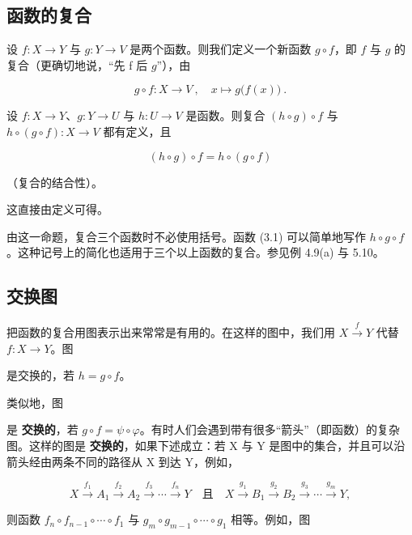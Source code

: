 \subsection*{函数的复合}

设 $f: X \to Y$ 与 $g: Y \to V$ 是两个函数。则我们定义一个新函数 $g \circ f$，即 $f$ 与 $g$ 的复合（更确切地说，“先 f 后 $g$”），由

\[
g\circ f\colon X\to V~,\quad x\mapsto g\bigl(f(x)\bigr)~.
\]

\begin{proposition}

设 $f: X \to Y$、$g: Y \to U$ 与 $h: U \to V$ 是函数。则复合 $(h \circ g) \circ f$ 与 $h \circ (g \circ f): X \to V$ 都有定义，且

\begin{equation}
(h\circ g)\circ f=h\circ(g\circ f)
\end{equation}

（复合的结合性）。

\proofhead
这直接由定义可得。

由这一命题，复合三个函数时不必使用括号。函数 (3.1) 可以简单地写作 $ h \circ g \circ f $。这种记号上的简化也适用于三个以上函数的复合。参见例 4.9(a) 与 5.10。
\end{proposition}

\subsection*{交换图}

把函数的复合用图表示出来常常是有用的。在这样的图中，我们用 $ X \xrightarrow{f} Y $ 代替 $ f: X \to Y $。图


是交换的，若 $h = g \circ f$。

类似地，图


是 \textbf{交换的}，若 $ g \circ f = \psi \circ \varphi $。有时人们会遇到带有很多“箭头”（即函数）的复杂图。这样的图是 \textbf{交换的}，如果下述成立：若 X 与 Y 是图中的集合，并且可以沿箭头经由两条不同的路径从 X 到达 Y，例如，

\[
X\xrightarrow{f_{1}}A_{1}\xrightarrow{f_{2}}A_{2}\xrightarrow{f_{3}}\cdots\xrightarrow{f_{n}}Y\quad\text{且}\quad X\xrightarrow{g_{1}}B_{1}\xrightarrow{g_{2}}B_{2}\xrightarrow{g_{3}}\cdots\xrightarrow{g_{m}}Y,
\]

则函数 $ f_n \circ f_{n-1} \circ \cdots \circ f_1 $ 与 $ g_m \circ g_{m-1} \circ \cdots \circ g_1 $ 相等。例如，图

